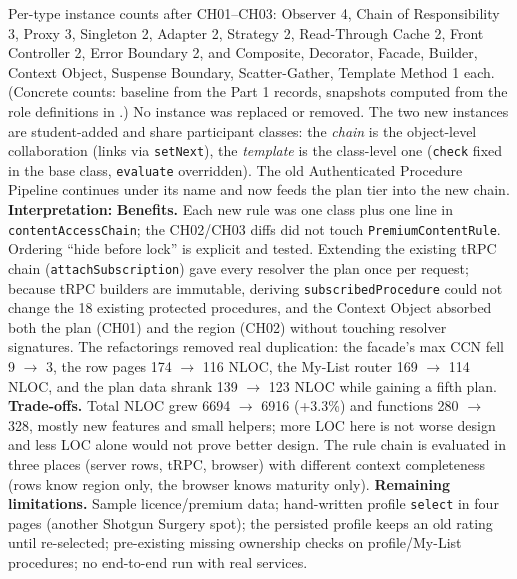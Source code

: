 \documentclass[11pt,a4paper]{article}
\newcommand{\entry}[2]{\textbf{#1:} #2\par}
\begin{document}
Per-type instance counts after CH01--CH03: Observer 4, Chain of Responsibility 3, Proxy 3, Singleton 2, Adapter 2, Strategy 2, Read-Through Cache 2, Front Controller 2, Error Boundary 2, and Composite, Decorator, Facade, Builder, Context Object, Suspense Boundary, Scatter-Gather, Template Method 1 each. (Concrete counts: baseline from the Part 1 records, snapshots computed from the role definitions in .) No instance was replaced or removed. The two new instances are student-added and share participant classes: the \emph{chain} is the object-level collaboration (links via \texttt{setNext}), the \emph{template} is the class-level one (\texttt{check} fixed in the base class, \texttt{evaluate} overridden). The old Authenticated Procedure Pipeline continues under its name and now feeds the plan tier into the new chain.
\entry{Interpretation}{\textbf{Benefits.} Each new rule was one class plus one line in \texttt{contentAccessChain}; the CH02/CH03 diffs did not touch \texttt{PremiumContentRule}. Ordering ``hide before lock'' is explicit and tested. Extending the existing tRPC chain (\texttt{attachSubscription}) gave every resolver the plan once per request; because tRPC builders are immutable, deriving \texttt{subscribedProcedure} could not change the 18 existing protected procedures, and the Context Object absorbed both the plan (CH01) and the region (CH02) without touching resolver signatures. The refactorings removed real duplication: the facade's max CCN fell 9 $\rightarrow$ 3, the row pages 174 $\rightarrow$ 116 NLOC, the My-List router 169 $\rightarrow$ 114 NLOC, and the plan data shrank 139 $\rightarrow$ 123 NLOC while gaining a fifth plan. \textbf{Trade-offs.} Total NLOC grew 6694 $\rightarrow$ 6916 (+3.3\%) and functions 280 $\rightarrow$ 328, mostly new features and small helpers; more LOC here is not worse design and less LOC alone would not prove better design. The rule chain is evaluated in three places (server rows, tRPC, browser) with different context completeness (rows know region only, the browser knows maturity only). \textbf{Remaining limitations.} Sample licence/premium data; hand-written profile \texttt{select} in four pages (another Shotgun Surgery spot); the persisted profile keeps an old rating until re-selected; pre-existing missing ownership checks on profile/My-List procedures; no end-to-end run with real services.}
\end{document}
